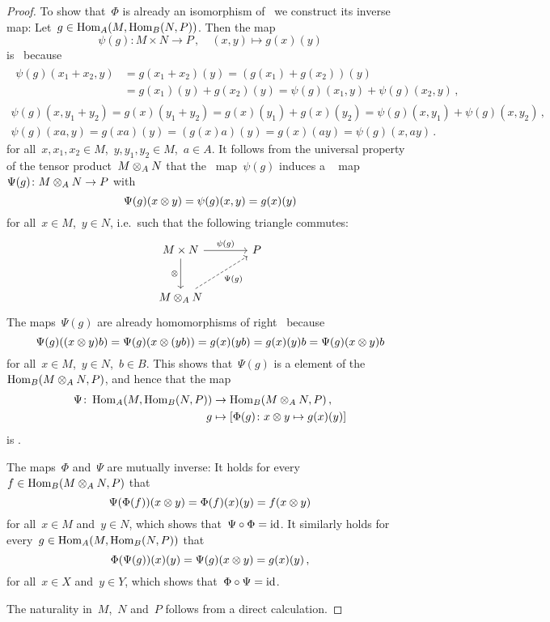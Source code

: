 \begin{proof}
  To show that~$\Phi$ is already an isomorphism of~{\modules{$\kf$}} we construct its inverse map:
  Let~$g \in \operatorname{Hom}_A(M, \operatorname{Hom}_B(N,P))$.
  Then the map
  \[
            \psi(g)
    \colon  M \times N
    \to     P \,,
    \quad   (x,y)
    \mapsto g(x)(y)
  \]
  is~{} because
  \begin{gather*}
    \begin{aligned}
          \psi(g)(x_1 + x_2, y)
      &=  g(x_1 + x_2)(y)
       =  (g(x_1) + g(x_2))(y)  \\
      &=  g(x_1)(y) + g(x_2)(y)
       =  \psi(g)(x_1,y) + \psi(g)(x_2,y) \,,
    \end{aligned}
  \\
      \psi(g)(x, y_1 + y_2)
    = g(x)(y_1 + y_2)
    = g(x)(y_1) + g(x)(y_2)
    = \psi(g)(x, y_1) + \psi(g)(x, y_2) \,,
  \\
      \psi(g)(xa, y)
    = g(xa)(y)
    = (g(x)a)(y)
    = g(x)(ay)
    = \psi(g)(x,ay) \,.
  \end{gather*}
  for all~$x, x_1, x_2 \in M$,~$y, y_1, y_2 \in M$,~$a \in A$.
  It follows from the universal property of the tensor product~$M \otimes_A N$ that the~{} map~$\psi(g)$ induces a {\welldef}~{\klin} map~$\Psi(g) \colon M \otimes_A N \to P$ with
  \[
      \Psi(g)(x \otimes y)
    = \psi(g)(x, y)
    = g(x)(y)
  \]
  for all~$x \in M$,~$y \in N$, i.e.\ such that the following triangle commutes:
  \[
    \begin{tikzcd}[sep = large]
        M \times N
        \arrow{r}[above]{\psi(g)}
        \arrow{d}[left]{\tensor}
      & P
      \\
        M \tensor_A N
        \arrow[dashed]{ur}[below right]{\Psi(g)}
      & {}
    \end{tikzcd}
  \]
  The maps~$\Psi(g)$ are already homomorphisms of right~{} because
  \[
      \Psi(g)((x \otimes y) b)
    = \Psi(g)(x \otimes (yb))
    = g(x)(yb)
    = g(x)(y) b
    = \Psi(g)(x \otimes y) b
  \]
  for all~$x \in M$,~$y \in N$,~$b \in B$.
  This shows that~$\Psi(g)$ is a {\welldef} element of the~{\module{$\kf$}}~$\operatorname{Hom}_B(M \otimes_A N, P)$, and hence that the map
  \begin{align*}
              \Psi
     \colon   \operatorname{Hom}_A(M, \operatorname{Hom}_B(N,P))
    &\to      \operatorname{Hom}_B(M \otimes_A N, P) \,, \\
              g
    &\mapsto  \left[
                        \Phi(g)
                \colon  x \otimes y
                \mapsto g(x)(y)
              \right]
  \end{align*}
  is {\welldef}.
  
  The maps~$\Phi$ and~$\Psi$ are mutually inverse:
  It holds for every~$f \in \operatorname{Hom}_B(M \otimes_A N, P)$ that
  \[
      \Psi(\Phi(f))(x \otimes y)
    = \Phi(f)(x)(y)
    = f(x \otimes y)
  \]
  for all~$x \in M$ and~$y \in N$, which shows that~$\Psi \circ \Phi = \operatorname{id}$.
  It similarly holds for every~$g \in \operatorname{Hom}_A(M, \operatorname{Hom}_B(N, P))$ that
  \[
      \Phi(\Psi(g))(x)(y)
    = \Psi(g)(x \otimes y)
    = g(x)(y) \,,
  \]
  for all~$x \in X$ and~$y \in Y$, which shows that~$\Phi \circ \Psi = \operatorname{id}$.
  
  The naturality in~$M$,~$N$ and~$P$ follows from a direct calculation.
\end{proof}




